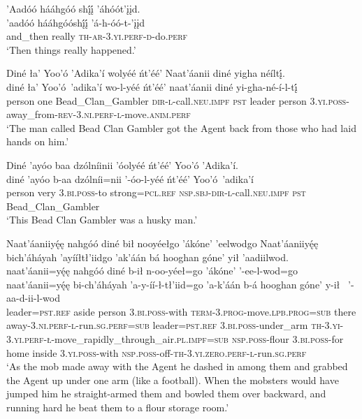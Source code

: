 \ea\label{ex:text3-4-4}
’Aadóó hááhgóó shį́į́ ’áhóót’įįd.\\
\gll ’aadóó	hááhgóóshį́į́	’á-h-óó-t-’įįd\\
     and\_then	really	\textsc{th}-\textsc{ar}-3.\textsc{yi}.\textsc{perf}-\textsc{d}-do.\textsc{perf}\\
\glt `Then things really happened.'
\z

\ea\label{ex:text3-4-5}
Diné ła’ Yoo’ó ’Adika’í wolyéé ńt’éé’ Naat’áanii diné yigha néíltį́.\\
\gll diné	ła’	Yoo’ó~{’adika’í}	wo-l-yéé	ńt’éé’	naat’áanii	diné	yi-gha-né-í-l-tį́\\
     person	one	Bead\_Clan\_Gambler	\textsc{dir}-\textsc{l}-call.\textsc{neu}.\textsc{impf}	\textsc{pst}	leader	person	3.\textsc{yi}.\textsc{poss}-away\_from-\textsc{rev}-3.\textsc{ni}.\textsc{perf}-\textsc{l}-move.\textsc{anim}.\textsc{perf}\\
\glt `The man called Bead Clan Gambler got the Agent back from those who had laid hands on him.'
\z

\ea\label{ex:text3-4-6}
Diné ’ayóo baa dzólníinii ’óolyéé ńt’éé’ Yoo’ó ’Adika’í.\\
\gll diné	’ayóo	b-aa	dzólníi=nii	’-óo-l-yéé	ńt’éé’	Yoo’ó~{’adika’í}\\
     person	very	3.\textsc{bi}.\textsc{poss}-to	strong=\textsc{pcl}.\textsc{ref}	\textsc{nsp}.\textsc{sbj}-\textsc{dir}-\textsc{l}-call.\textsc{neu}.\textsc{impf}	\textsc{pst}	Bead\_Clan\_Gambler\\
\glt `This Bead Clan Gambler was a husky man.'
\z

\ea\label{ex:text3-4-7}
Naat’áaniiyę́ę nahgóó diné bił nooyéełgo ’ákóne’ ’eelwodgo Naat’áaniiyę́ę bich’áháyah ’ayííłtł’iidgo ’ak’áán bá hooghan góne’ yił ’aadiilwod.\\
\gll naat’áanii=yę́ę	nahgóó	diné	b-ił	n-oo-yéeł=go	’ákóne’	’-ee-l-wod=go	naat’áanii=yę́ę	bi-ch’áháyah	’a-y-íí-ł-tł’iid=go	’a-k’áán	b-á	hooghan	góne’	y-ił	~{’-aa-d-ii-l-wod}\\
     leader=\textsc{pst}.\textsc{ref}	aside	person	3.\textsc{bi}.\textsc{poss}-with	\textsc{term}-3.\textsc{prog}-move.\textsc{lpb}.\textsc{prog}=\textsc{sub}	there	away-3.\textsc{ni}.\textsc{perf}-\textsc{l}-run.\textsc{sg}.\textsc{perf}=\textsc{sub}	leader=\textsc{pst}.\textsc{ref}	3.\textsc{bi}.\textsc{poss}-under\_arm	\textsc{th}-3.\textsc{yi}-3.\textsc{yi}.\textsc{perf}-\textsc{ł}-move\_rapidly\_through\_air.\textsc{pl}.\textsc{impf}=\textsc{sub}	\textsc{nsp}.\textsc{poss}-flour	3.\textsc{bi}.\textsc{poss}-for	home	inside	3.\textsc{yi}.\textsc{poss}-with	\textsc{nsp}.\textsc{poss}-off-\textsc{th}-3.\textsc{yi}.\textsc{zero}.\textsc{perf}-\textsc{l}-run.\textsc{sg}.\textsc{perf}\\
\glt `As the mob made away with the Agent he dashed in among them and grabbed the Agent up under one arm (like a football). When the mobsters would have jumped him he straight-armed them and bowled them over backward, and running hard he beat them to a flour storage room.'
\z

